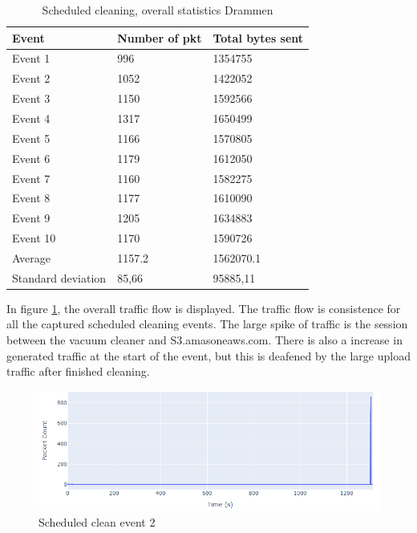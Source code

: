 \begin{table}[H]
\centering
\caption{Scheduled cleaning, overall statistics Drammen}
\label{tab:scoverallDRA}
\begin{tabular}{|l|l|l|}
\hline
\textbf{Event} & \textbf{Number of pkt} & \textbf{Total bytes sent} \\ \hline
Event 1        & 996                    & 1354755                   \\ \hline
Event 2        & 1052                   & 1422052                   \\ \hline
Event 3        & 1150                   & 1592566                   \\ \hline
Event 4        & 1317                   & 1650499                   \\ \hline
Event 5        & 1166                   & 1570805                   \\ \hline
Event 6        & 1179                   & 1612050                   \\ \hline
Event 7        & 1160                   & 1582275                   \\ \hline
Event 8        & 1177                   & 1610090                   \\ \hline
Event 9        & 1205                   & 1634883                   \\ \hline
Event 10       & 1170                   & 1590726                   \\ \hline
Average        & 1157.2                 & 1562070.1                 \\ \hline
Standard deviation        & 85,66
       & 95885,11               \\ \hline
\end{tabular}
\end{table}

In figure \ref{fig:Sc-graph}, the overall traffic flow is displayed. The traffic flow is consistence for all the captured scheduled cleaning events. The large spike of traffic is the session between the vacuum cleaner and S3.amasoneaws.com. There is also a increase in generated traffic at the start of the event, but this is 
deafened by the large upload traffic after finished cleaning.
\begin{figure}[H]
    \centering
    \includegraphics[width=\textwidth]{figures/SC-graph.png}
    \caption{Scheduled clean event 2}
    \label{fig:Sc-graph}
\end{figure}

